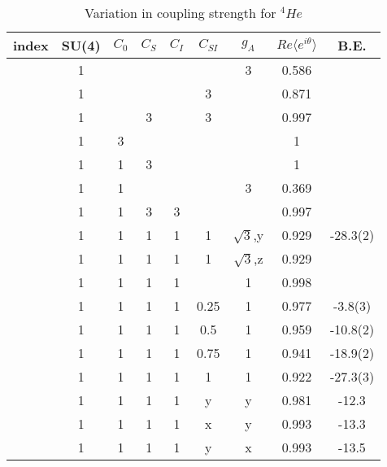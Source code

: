 \documentclass[10pt]{book}
\def\la{\langle}
\def\ra{\rangle}
\begin{document}
\begin{table}
\caption{Variation in coupling strength for $^4He$}
\begin{center}
\begin{tabular}{c|cccccc|cc}
index & SU(4) & $C_0$ & $C_S$ & $C_I$ & $C_{SI}$ & $g_A$ 
  & $Re \la e^{i\theta}\ra$ & B.E. \\ \hline
      & 1     &       &       &       &          & 3 
      & 0.586 &  \\
      & 1     &       &       &       &  3       &  
      & 0.871 &  \\      
      & 1     &       &   3    &      &  3       &  
      & 0.997 &  \\
      & 1     &   3   &       &       &         &  
      & 1 &  \\
      & 1     &   1   &   3   &       &         &  
      & 1 &  \\
      & 1     &   1    &       &       &         & 3 
      & 0.369 &  \\
      & 1     &   1    &   3    &   3    &         &  
      & 0.997 & \\
      \hline
      & 1     &   1    &   1    &   1    &   1   & $\sqrt{3}$,y  
      & 0.929 & -28.3(2)\\
      & 1     &   1    &   1    &   1    &   1   & $\sqrt{3}$,z  
      & 0.929 &   \\  
      & 1     &   1    &   1    &   1    &       & 1  
      & 0.998 &   \\   
      \hline
      & 1     &   1    &   1    &   1    & 0.25      & 1  
      & 0.977 &   -3.8(3)\\
       & 1     &   1    &   1    &   1    & 0.5      & 1  
       & 0.959 &   -10.8(2)\\
       & 1     &   1    &   1    &   1    & 0.75      & 1  
       & 0.941 &   -18.9(2)\\
       & 1     &   1    &   1    &   1    & 1      & 1  
       & 0.922 &   -27.3(3)\\                 
       & 1     &   1    &   1    &   1    & y      & y  
       & 0.981 &   -12.3\\            
       & 1     &   1    &   1    &   1    & x      & y  
       & 0.993 &   -13.3\\  
       & 1     &   1    &   1    &   1    & y      & x  
       & 0.993 &   -13.5\\                                      
\end{tabular}  
\end{center} 
\end{table} 
\end{document}
